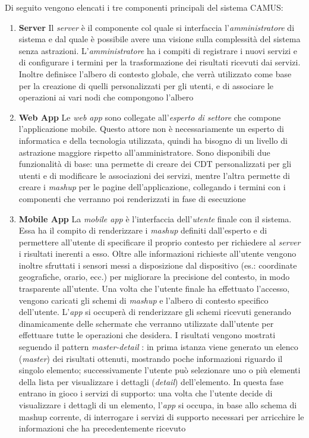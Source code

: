 Di seguito vengono elencati i tre componenti principali del sistema CAMUS:

\begin{enumerate}
	\item \textbf{Server}
	Il \emph{server} è il componente col quale si interfaccia l'\emph{amministratore} di sistema e dal quale è possibile avere una visione sulla complessità del sistema senza astrazioni. L'\emph{amministratore} ha i compiti di registrare i nuovi servizi e di configurare i termini per la trasformazione dei risultati ricevuti dai servizi. Inoltre definisce l'albero di contesto globale, che verrà utilizzato come base per la creazione di quelli personalizzati per gli utenti, e di associare le operazioni ai vari nodi che compongono l'albero
	\item \textbf{Web App}
	Le \emph{web app} sono collegate all'\emph{esperto di settore} che compone l'ap\-pli\-ca\-zio\-ne mobile. Questo attore non è necessariamente un esperto di informatica e della tecnologia utilizzata, quindi ha bisogno di un livello di astrazione maggiore rispetto all'amministratore. Sono disponibili due funzionalità di base: una permette di creare dei CDT personalizzati per gli utenti e di modificare le associazioni dei servizi, mentre l'altra permette di creare i \emph{mashup} per le pagine dell'applicazione, collegando i termini con i componenti che verranno poi renderizzati in fase di esecuzione
	\item \textbf{Mobile App}
	La \emph{mobile app} è l'interfaccia dell'\emph{utente} finale con il sistema. Essa ha il compito di renderizzare i \emph{mashup} definiti dall'esperto e di permettere all'utente di specificare il proprio contesto per richiedere al \emph{server} i risultati inerenti a esso. Oltre alle informazioni richieste all'utente vengono inoltre sfruttati i sensori messi a disposizione dal dispositivo (es.: coordinate geografiche, orario, ecc.) per migliorare la precisione del contesto, in modo trasparente all'utente.
	Una volta che l'utente finale ha effettuato l'accesso, vengono caricati gli schemi di \emph{mashup} e l'albero di contesto specifico dell'utente. L'\emph{app} si occuperà di renderizzare gli schemi ricevuti generando dinamicamente delle schermate che verranno utilizzate dall'utente per effettuare tutte le operazioni che desidera.
	I risultati vengono mostrati seguendo il pattern \emph{master-detail} \cite{molina2002user}: in prima istanza viene generato un elenco (\emph{master}) dei risultati ottenuti, mostrando poche informazioni riguardo il singolo elemento; successivamente l'utente può selezionare uno o più elementi della lista per visualizzare i dettagli (\emph{detail}) dell'elemento. In questa fase entrano in gioco i servizi di supporto: una volta che l'utente decide di visualizzare i dettagli di un elemento, l'\emph{app} si occupa, in base allo schema di mashup corrente, di interrogare i servizi di supporto necessari per arricchire le informazioni che ha precedentemente ricevuto
\end{enumerate}

